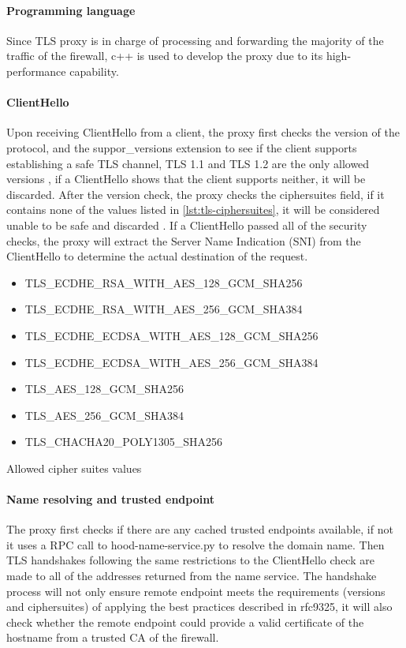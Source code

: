 \documentclass[mscthesis]{usiinfthesis}
\begin{document}
\paragraph{Programming language}
Since TLS proxy is in charge of processing and forwarding the majority of the traffic of the firewall, c++ is used to develop the proxy due to its high-performance capability.
\paragraph{ClientHello}
Upon receiving ClientHello from a client, the proxy first checks the version of the protocol, and the suppor\_versions extension to see if the client supports establishing a safe TLS channel, TLS 1.1 and TLS 1.2 are the only allowed versions \citep{rfc:bstprc}, if a ClientHello shows that the client supports neither, it will be discarded. After the version check, the proxy checks the ciphersuites field, if it contains none of the values listed in \cref{lst:tls-ciphersuites}, it will be considered unable to be safe and discarded \citep{rfc:bstprc}. If a ClientHello passed all of the security checks, the proxy will extract the Server Name Indication (SNI) from the ClientHello to determine the actual destination of the request.

\begin{table}[H]
  \begin{itemize}
    \item TLS\_ECDHE\_RSA\_WITH\_AES\_128\_GCM\_SHA256
    \item TLS\_ECDHE\_RSA\_WITH\_AES\_256\_GCM\_SHA384
    \item TLS\_ECDHE\_ECDSA\_WITH\_AES\_128\_GCM\_SHA256
    \item TLS\_ECDHE\_ECDSA\_WITH\_AES\_256\_GCM\_SHA384
    \item TLS\_AES\_128\_GCM\_SHA256
    \item TLS\_AES\_256\_GCM\_SHA384
    \item TLS\_CHACHA20\_POLY1305\_SHA256
  \end{itemize}
  \caption{Allowed cipher suites values}
  \label{lst:tls-ciphersuites}
\end{table}

\paragraph{Name resolving and trusted endpoint}
The proxy first checks if there are any cached trusted endpoints available, if not it uses a RPC call to hood-name-service.py to resolve the domain name. Then TLS handshakes following the same restrictions to the ClientHello check are made to all of the addresses returned from the name service. The handshake process will not only ensure remote endpoint meets the requirements (versions and ciphersuites) of applying the best practices described in rfc9325, it will also check whether the remote endpoint could provide a valid certificate of the hostname from a trusted CA of the firewall.
\end{document}
